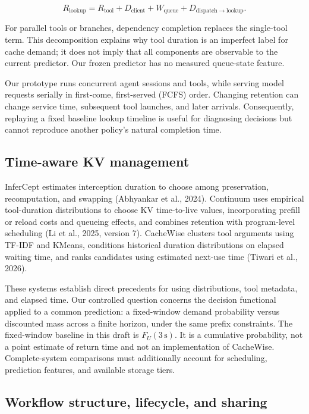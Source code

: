 \documentclass[sigconf, screen, review]{acmart}
\begin{document}
\[
R_{\mathrm{lookup}}=R_{\mathrm{tool}}+D_{\mathrm{client}}
 +W_{\mathrm{queue}}+D_{\mathrm{dispatch\to lookup}}.
\]

For parallel tools or branches, dependency completion replaces the
single-tool term. This decomposition explains why tool duration is an
imperfect label for cache demand; it does not imply that all components
are observable to the current predictor. Our frozen predictor has no
measured queue-state feature.

Our prototype runs concurrent agent sessions and tools, while serving
model requests serially in first-come, first-served (FCFS) order.
Changing retention can change service time, subsequent tool launches,
and later arrivals. Consequently, replaying a fixed baseline lookup
timeline is useful for diagnosing decisions but cannot reproduce another
policy's natural completion time.

\subsection{Time-aware KV
management}\label{time-aware-kv-management}

InferCept estimates interception duration to choose among preservation,
recomputation, and swapping (Abhyankar et al., 2024). Continuum uses
empirical tool-duration distributions to choose KV time-to-live values,
incorporating prefill or reload costs and queueing effects, and combines
retention with program-level scheduling (Li et al., 2025, version 7).
CacheWise clusters tool arguments using TF-IDF and KMeans, conditions
historical duration distributions on elapsed waiting time, and ranks
candidates using estimated next-use time (Tiwari et al., 2026).

These systems establish direct precedents for using distributions, tool
metadata, and elapsed time. Our controlled question concerns the
decision functional applied to a common prediction: a fixed-window
demand probability versus discounted mass across a finite horizon, under
the same prefix constraints. The fixed-window baseline in this draft is
\(F_U(3\,\mathrm{s})\). It is a cumulative probability, not a point
estimate of return time and not an implementation of CacheWise.
Complete-system comparisons must additionally account for scheduling,
prediction features, and available storage tiers.

\subsection{Workflow structure, lifecycle, and
sharing}\label{workflow-structure-lifecycle-and-sharing}
\end{document}
